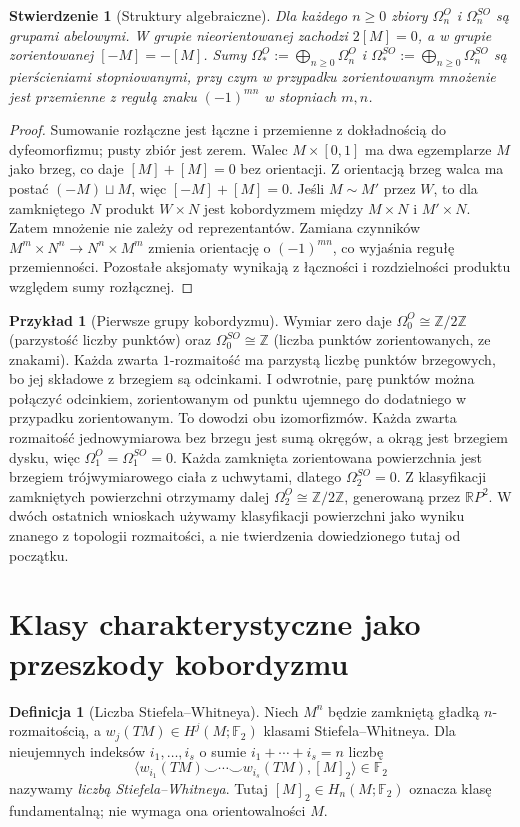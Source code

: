 \documentclass[11pt,a4paper,oneside]{report}
\newcommand{\F}{\mathbb{F}}
\newcommand{\R}{\mathbb{R}}
\newcommand{\Z}{\mathbb{Z}}
\theoremstyle{plain}
\newtheorem{stwierdzenie}[twierdzenie]{Stwierdzenie}
\theoremstyle{definition}
\newtheorem{definicja}[twierdzenie]{Definicja}
\newtheorem{przyklad}[twierdzenie]{Przykład}
\theoremstyle{remark}
\begin{document}
\begin{stwierdzenie}[Struktury algebraiczne]
\label{prop:bordism-group-v9}
Dla każdego $n\ge0$ zbiory $\Omega_n^O$ i
$\Omega_n^{SO}$ są grupami abelowymi. W grupie
nieorientowanej zachodzi $2[M]=0$, a w grupie
zorientowanej $[-M]=-[M]$. Sumy
$\Omega_*^O:=\bigoplus_{n\ge0}\Omega_n^O$
i $\Omega_*^{SO}:=\bigoplus_{n\ge0}\Omega_n^{SO}$
są pierścieniami stopniowanymi, przy czym
w przypadku zorientowanym mnożenie jest
przemienne z regułą znaku $(-1)^{mn}$ w stopniach
$m,n$.
\end{stwierdzenie}
\begin{proof}
Sumowanie rozłączne jest łączne i przemienne z
dokładnością do dyfeomorfizmu; pusty zbiór jest
zerem. Walec $M\times[0,1]$ ma dwa egzemplarze
$M$ jako brzeg, co daje $[M]+[M]=0$ bez orientacji.
Z orientacją brzeg walca ma postać $(-M)\sqcup M$,
więc $[-M]+[M]=0$. Jeśli $M\sim M'$ przez $W$,
to dla zamkniętego $N$ produkt $W\times N$ jest
kobordyzmem między $M\times N$ i $M'\times N$.
Zatem mnożenie nie zależy od reprezentantów.
Zamiana czynników $M^m\times N^n\to N^n\times M^m$
zmienia orientację o $(-1)^{mn}$, co wyjaśnia
regułę przemienności. Pozostałe aksjomaty wynikają
z łączności i rozdzielności produktu względem
sumy rozłącznej.
\end{proof}

\begin{przyklad}[Pierwsze grupy kobordyzmu]
\label{ex:bordism-low-v9}
Wymiar zero daje $\Omega_0^O\cong\Z/2\Z$
(parzystość liczby punktów) oraz
$\Omega_0^{SO}\cong\Z$ (liczba punktów zorientowanych,
ze znakami). Każda zwarta $1$-rozmaitość ma parzystą
liczbę punktów brzegowych, bo jej składowe z brzegiem są
odcinkami. I odwrotnie, parę punktów można połączyć
odcinkiem, zorientowanym od punktu ujemnego do dodatniego
w przypadku zorientowanym. To dowodzi obu izomorfizmów. Każda zwarta rozmaitość jednowymiarowa
bez brzegu jest sumą okręgów, a okrąg jest brzegiem
dysku, więc $\Omega_1^O=\Omega_1^{SO}=0$.
Każda zamknięta zorientowana powierzchnia jest brzegiem
trójwymiarowego ciała z uchwytami, dlatego
$\Omega_2^{SO}=0$. Z klasyfikacji zamkniętych
powierzchni otrzymamy dalej
$\Omega_2^O\cong\Z/2\Z$, generowaną przez
$\R P^2$. W dwóch ostatnich wnioskach używamy
klasyfikacji powierzchni jako wyniku znanego z
topologii rozmaitości, a nie twierdzenia dowiedzionego
tutaj od początku.
\end{przyklad}

\section{Klasy charakterystyczne jako przeszkody kobordyzmu}
\begin{definicja}[Liczba Stiefela--Whitneya]
Niech $M^n$ będzie zamkniętą gładką $n$-rozmaitością,
a $w_j(TM)\in H^j(M;\F_2)$ klasami Stiefela--Whitneya.
Dla nieujemnych indeksów $i_1,\ldots,i_s$ o sumie
$i_1+\cdots+i_s=n$ liczbę
\[
\bigl\langle w_{i_1}(TM)\smile\cdots\smile
w_{i_s}(TM),[M]_2\bigr\rangle\in\F_2
\]
nazywamy \emph{liczbą Stiefela--Whitneya}.
Tutaj $[M]_2\in H_n(M;\F_2)$ oznacza klasę fundamentalną;
nie wymaga ona orientowalności $M$.
\end{definicja}
\end{document}
